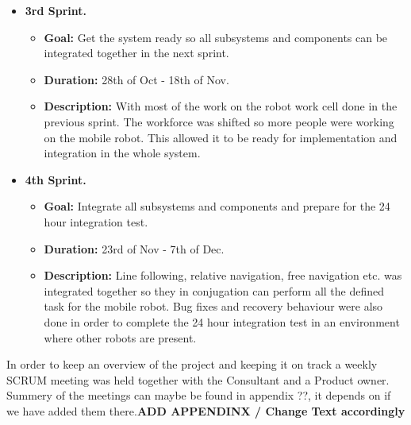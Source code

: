\begin{itemize}
    \item \textbf{3rd Sprint.}
    \begin{itemize}
    	\item \textbf{Goal:} Get the system ready so all subsystems and components can be integrated together in the next sprint.
    	\item \textbf{Duration:} 28th of Oct - 18th of Nov.
    	\item \textbf{Description:} With most of the work on the robot work cell done in the previous sprint. The workforce was shifted so more people were working on the mobile robot. This allowed it to be ready for implementation and integration in the whole system.
	\end{itemize}
	
    \item \textbf{4th Sprint.}
    \begin{itemize}
    	\item \textbf{Goal:} Integrate all subsystems and components and prepare for the 24 hour integration test.
    	\item \textbf{Duration:} 23rd of Nov - 7th of Dec.
    	\item \textbf{Description:} Line following, relative navigation, free navigation etc. was integrated together so they in conjugation can perform all the defined task for the mobile robot. Bug fixes and recovery behaviour were also done in order to complete the 24 hour integration test in an environment where other robots are present.
	\end{itemize}
\end{itemize}

In order to keep an overview of the project and keeping it on track a weekly SCRUM meeting was held together with the Consultant and a Product owner. Summery of the meetings can maybe be found in appendix ??, it depends on if we have added them there.\textbf{ADD APPENDINX / Change Text accordingly}




